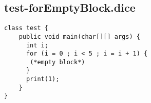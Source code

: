 \subsection{test-forEmptyBlock.dice}
\begin{verbatim}
class test {
	public void main(char[][] args) {
	  int i;
	  for (i = 0 ; i < 5 ; i = i + 1) {
	   (*empty block*)
	  }
	  print(1);
	}
}
\end{verbatim}